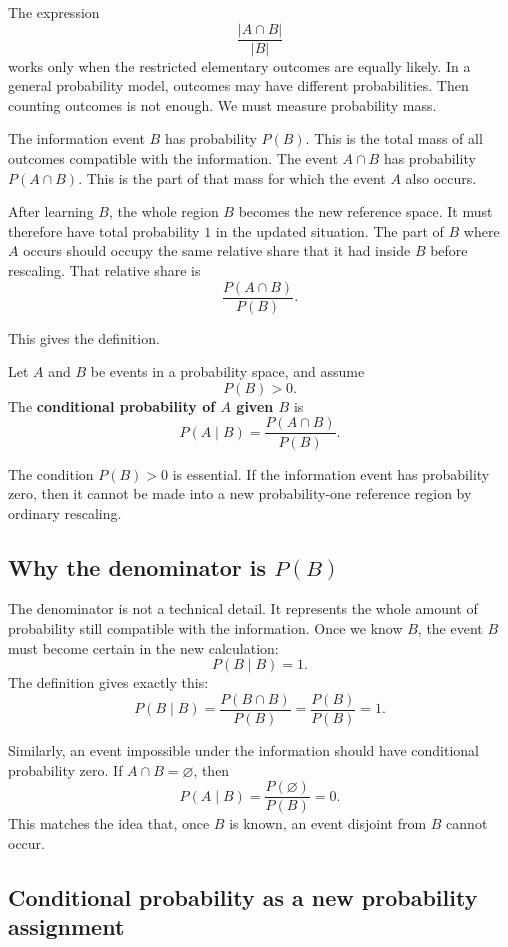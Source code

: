 The expression
\[
\frac{|A\cap B|}{|B|}
\]
works only when the restricted elementary outcomes are equally likely. In a
general probability model, outcomes may have different probabilities. Then
counting outcomes is not enough. We must measure probability mass.

The information event \(B\) has probability \(P(B)\). This is the total mass of
all outcomes compatible with the information. The event \(A\cap B\) has
probability \(P(A\cap B)\). This is the part of that mass for which the event
\(A\) also occurs.

After learning \(B\), the whole region \(B\) becomes the new reference space. It
must therefore have total probability \(1\) in the updated situation. The part
of \(B\) where \(A\) occurs should occupy the same relative share that it had
inside \(B\) before rescaling. That relative share is
\[
\frac{P(A\cap B)}{P(B)}.
\]

This gives the definition.

\begin{definitionbox}
Let \(A\) and \(B\) be events in a probability space, and assume
\[
P(B)>0.
\]
The \textbf{conditional probability of \(A\) given \(B\)} is
\[
P(A\mid B)=\frac{P(A\cap B)}{P(B)}.
\]
\end{definitionbox}

The condition \(P(B)>0\) is essential. If the information event has probability
zero, then it cannot be made into a new probability-one reference region by
ordinary rescaling.

\subsection*{Why the denominator is \(P(B)\)}

The denominator is not a technical detail. It represents the whole amount of
probability still compatible with the information. Once we know \(B\), the event
\(B\) must become certain in the new calculation:
\[
P(B\mid B)=1.
\]
The definition gives exactly this:
\[
P(B\mid B)=\frac{P(B\cap B)}{P(B)}=
\frac{P(B)}{P(B)}=1.
\]

Similarly, an event impossible under the information should have conditional
probability zero. If \(A\cap B=\varnothing\), then
\[
P(A\mid B)=\frac{P(\varnothing)}{P(B)}=0.
\]
This matches the idea that, once \(B\) is known, an event disjoint from \(B\)
cannot occur.

\subsection*{Conditional probability as a new probability assignment}

